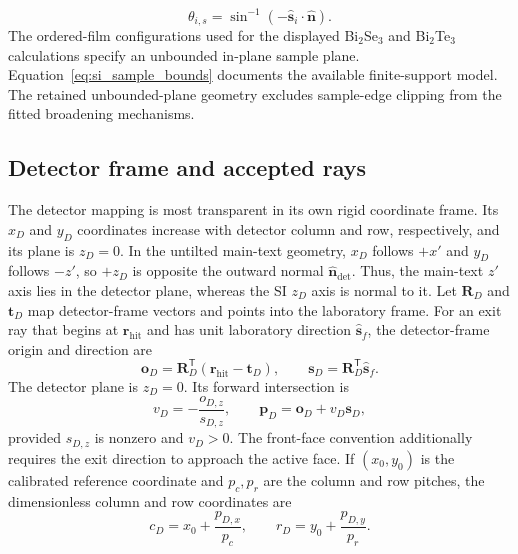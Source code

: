 \begin{equation}
\theta_{i,s}
=\sin^{-1}\!\left(-\hat{\mathbf s}_i\cdot\hat{\mathbf n}\right).
\label{eq:si_local_incidence_angle}
\end{equation}
The ordered-film configurations used for the displayed Bi$_2$Se$_3$ and Bi$_2$Te$_3$ calculations specify an unbounded in-plane sample plane. Equation~\eqref{eq:si_sample_bounds} documents the available finite-support model. The retained unbounded-plane geometry excludes sample-edge clipping from the fitted broadening mechanisms.

\subsection{Detector frame and accepted rays}

The detector mapping is most transparent in its own rigid coordinate frame. Its $x_D$ and $y_D$ coordinates increase with detector column and row, respectively, and its plane is $z_D=0$. In the untilted main-text geometry, $x_D$ follows $+x'$ and $y_D$ follows $-z'$, so $+z_D$ is opposite the outward normal $\hat{\mathbf n}_{\mathrm{det}}$. Thus, the main-text $z'$ axis lies in the detector plane, whereas the SI $z_D$ axis is normal to it. Let $\mathbf R_D$ and $\mathbf t_D$ map detector-frame vectors and points into the laboratory frame. For an exit ray that begins at $\mathbf r_{\mathrm{hit}}$ and has unit laboratory direction $\hat{\mathbf s}_f$, the detector-frame origin and direction are
\begin{equation}
\mathbf o_D=\mathbf R_D^{\mathsf T}(\mathbf r_{\mathrm{hit}}-\mathbf t_D),
\qquad
\mathbf s_D=\mathbf R_D^{\mathsf T}\hat{\mathbf s}_f.
\label{eq:si_detector_frame_ray}
\end{equation}
The detector plane is $z_D=0$. Its forward intersection is
\begin{equation}
v_D=-\frac{o_{D,z}}{s_{D,z}},
\qquad
\mathbf p_D=\mathbf o_D+v_D\mathbf s_D,
\label{eq:si_detector_plane_intersection}
\end{equation}
provided $s_{D,z}$ is nonzero and $v_D>0$. The front-face convention additionally requires the exit direction to approach the active face. If $(x_0,y_0)$ is the calibrated reference coordinate and $p_c,p_r$ are the column and row pitches, the dimensionless column and row coordinates are
\begin{equation}
c_D=x_0+\frac{p_{D,x}}{p_c},
\qquad
r_D=y_0+\frac{p_{D,y}}{p_r}.
\label{eq:si_detector_pixel_coordinates}
\end{equation}

